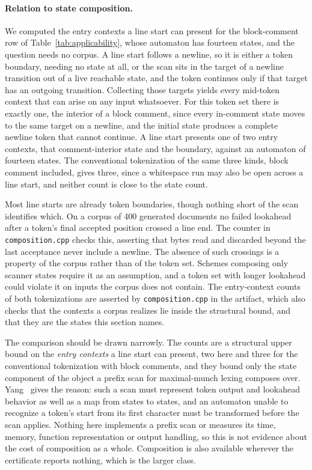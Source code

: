 \documentclass[11pt,a4paper]{article}
\theoremstyle{definition}
\theoremstyle{plain}
\newcommand{\code}[1]{\texttt{#1}}
\begin{document}
\paragraph{Relation to state composition.} We computed the entry contexts a line start can present for the block-comment
row of Table~\ref{tab:applicability}, whose automaton has fourteen states, and the question needs no corpus. A line
start follows a newline, so it is either a token boundary, needing no state at all, or the scan sits in the target of a
newline transition out of a live reachable state, and the token continues only if that target has an outgoing
transition. Collecting those targets yields every mid-token context that can arise on any input whatsoever. For this
token set there is exactly one, the interior of a block comment, since every in-comment state moves to the same target
on a newline, and the initial state produces a complete newline token that cannot continue. A line start presents one of
two entry contexts, that comment-interior state and the boundary, against an automaton of fourteen states. The
conventional tokenization of the same three kinds, block comment included, gives three, since a whitespace run may also
be open across a line start, and neither count is close to the state count.

Most line starts are already token boundaries, though nothing short of the scan identifies which. On a corpus of 400
generated documents no failed lookahead after a token's final accepted position crossed a line end. The counter in
\code{composition.cpp} checks this, asserting that bytes read and discarded beyond the last acceptance never include a
newline. The absence of such crossings is a property of the corpus rather than of the token set. Schemes composing only
scanner states require it as an assumption, and a token set with longer lookahead could violate it on inputs the corpus
does not contain. The entry-context counts of both tokenizations are asserted by \code{composition.cpp} in the artifact,
which also checks that the contexts a corpus realizes lie inside the structural bound, and that they are the states this
section names.

The comparison should be drawn narrowly. The counts are a structural upper bound on the \emph{entry contexts} a line
start can present, two here and three for the conventional tokenization with block comments, and they bound only the
state component of the object a prefix scan for maximal-munch lexing composes over. Yang~\cite{yang1996mealy} gives the
reason: such a scan must represent token output and lookahead behavior as well as a map from states to states, and an
automaton unable to recognize a token's start from its first character must be transformed before the scan applies.
Nothing here implements a prefix scan or measures its time, memory, function representation or output handling, so this
is not evidence about the cost of composition as a whole. Composition is also available wherever the certificate reports
nothing, which is the larger class.
\end{document}
